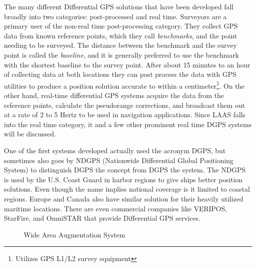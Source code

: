 The many different Differential GPS solutions that have been developed fall broadly into two categories: post-processed and real time. Surveyors are a primary user of the non-real time post-processing category.  They collect GPS data from known reference points, which they call \textit{benchmarks}, and the point needing to be surveyed.  The distance between the benchmark and the survey point is called the \textit{baseline}, and it is generally preferred to use the benchmark with the shortest baseline to the survey point. After about 15 minutes to an hour of collecting data at both locations they can post process the data with GPS utilities to produce a position solution accurate to within a centimeter\footnote{Utilizes GPS L1/L2 survey equipment}.  On the other hand, real-time differential GPS systems acquire the data from the reference points, calculate the pseudorange corrections, and broadcast them out at a rate of 2 to 5 Hertz to be used in navigation applications. Since LAAS falls into the real time category, it and a few other prominent real time DGPS systems will be discussed.

One of the first systems developed actually used the acronym DGPS, but sometimes also goes by NDGPS (Nationwide Differential Global Positioning System) to distinguish DGPS the concept from DGPS the system.  The NDGPS is used by the U.S. Coast Guard in harbor regions to give ships better position solutions.  Even though the name implies national coverage is it limited to coastal regions. Europe and Canada also have similar solution for their heavily utilized maritime locations. There are even commercial companies like VERIPOS, StarFire, and OmniSTAR that provide Differential GPS services.

\begin{figure}
	\centering
	\caption{Wide Area Augmentation System\citep[]{FAA_WAAS}}
	\label{fig:FAA_WAAS}
\end{figure}

